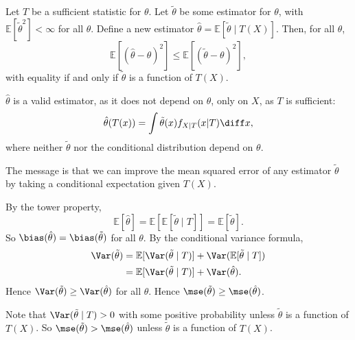 \documentclass[12pt]{article}
\begin{document}
\begin{theorem}
	Let $T$ be a sufficient statistic for $\theta$. Let $\tilde \theta$ be some estimator for $\theta$, with $\mathbb{E}[\tilde \theta^2] < \infty$ for all $\theta$. Define a new estimator $\hat \theta = \mathbb{E}[\tilde \theta \mid T(X)]$. Then, for all $\theta$,
	\[
	\mathbb{E}[(\hat \theta - \theta)^2] \leq \mathbb{E}[(\tilde \theta - \theta)^2]
	,\]
	with equality if and only if $\tilde \theta$ is a function of $T(X)$.
\end{theorem}

\begin{remark}
	$\hat \theta$ is a valid estimator, as it does not depend on $\theta$, only on $X$, as $T$ is sufficient:
	\[
	\hat \theta (T(x)) = \int \tilde \theta(x) f_{X|T}(x|T) \diff x
	,\]
	where neither $\tilde \theta$ nor the conditional distribution depend on $\theta$.
\end{remark}

The message is that we can improve the mean squared error of any estimator $\tilde \theta$ by taking a conditional expectation given $T(X)$.

\begin{proofbox}
	By the tower property,
	\[
	\mathbb{E}[\hat \theta] = \mathbb{E}[\mathbb{E}[\tilde \theta \mid T]] = \mathbb{E}[\tilde \theta]
	.\]
	So $\bias(\hat \theta) = \bias(\tilde \theta)$ for all $\theta$. By the conditional variance formula,
	\begin{align*}
		\Var(\tilde \theta) &= \mathbb{E}[\Var(\tilde \theta \mid T)] + \Var(\mathbb{E}[\tilde \theta \mid T]) \\
				    &= \mathbb{E}[\Var(\tilde \theta \mid T)] + \Var(\hat \theta).
	\end{align*}
	Hence $\Var (\tilde \theta) \geq \Var (\hat \theta)$ for all $\theta$. Hence $\mse(\tilde \theta) \geq \mse(\hat \theta)$.

	Note that $\Var(\tilde \theta \mid T) > 0$ with some positive probability unless $\tilde \theta$ is a function of $T(X)$. So $\mse(\tilde \theta) > \mse(\hat \theta)$ unless $\tilde \theta$ is a function of $T(X)$.
\end{proofbox}
\end{document}
